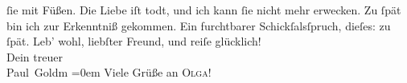 \begin{ledgroupsized}[t]{13cm}
               ſie mit Füßen. Die Liebe iſt todt, und ich kann ſie nicht mehr erwecken. Zu ſpät bin
               ich zur Erkenntniß gekommen. Ein furchtbarer Schickſalsſpruch, dieſes: zu ſpät.\pend
           \pstart
           Leb’ wohl, liebſter Freund, und reiſe glücklich! {\\[\baselineskip]}Dein treuer {\\[\baselineskip]}\spacefill\mbox{Paul Goldm}\pend
           \leftskip=0em{}\pstart
           \noindent{}Viele Grüße an \textsc{Olga}!\pend
           
         
         \endnumbering{}\end{ledgroupsized}  \newcommand{\dateiname}{L03380}\newcommand{\titel}{Paul Goldmann an Arthur Schnitzler, 4. 8. [1903]}\newcommand{\editorInnen}{Martin Anton Müller und Laura Untner}
      
